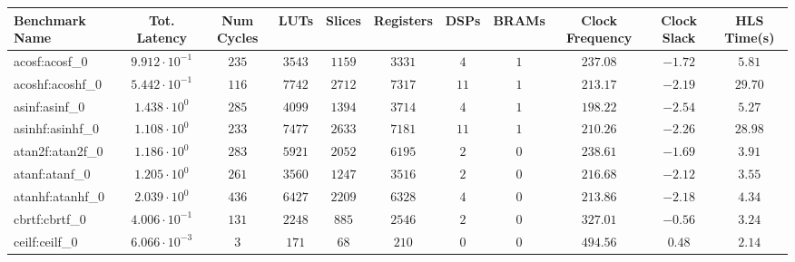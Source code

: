 \begin{tabular}{|l|c|c|c|c|c|c|c|c|c|c|}
\hline
Benchmark Name               & Tot. Latency            & Num Cycles & LUTs       & Slices    & Registers  & DSPs    & BRAMs & Clock Frequency & Clock Slack & HLS Time(s) \\
\hline
acosf:acosf\_0               & $ 9.912 \cdot 10^{-1} $ & $ 235    $ & $ 3543   $ & $ 1159  $ & $ 3331   $ & $ 4   $ & $ 1 $ & $ 237.08      $ & $ -1.72   $ & $ 5.81    $ \\
acoshf:acoshf\_0             & $ 5.442 \cdot 10^{-1} $ & $ 116    $ & $ 7742   $ & $ 2712  $ & $ 7317   $ & $ 11  $ & $ 1 $ & $ 213.17      $ & $ -2.19   $ & $ 29.70   $ \\
asinf:asinf\_0               & $ 1.438 \cdot 10^{0}  $ & $ 285    $ & $ 4099   $ & $ 1394  $ & $ 3714   $ & $ 4   $ & $ 1 $ & $ 198.22      $ & $ -2.54   $ & $ 5.27    $ \\
asinhf:asinhf\_0             & $ 1.108 \cdot 10^{0}  $ & $ 233    $ & $ 7477   $ & $ 2633  $ & $ 7181   $ & $ 11  $ & $ 1 $ & $ 210.26      $ & $ -2.26   $ & $ 28.98   $ \\
atan2f:atan2f\_0             & $ 1.186 \cdot 10^{0}  $ & $ 283    $ & $ 5921   $ & $ 2052  $ & $ 6195   $ & $ 2   $ & $ 0 $ & $ 238.61      $ & $ -1.69   $ & $ 3.91    $ \\
atanf:atanf\_0               & $ 1.205 \cdot 10^{0}  $ & $ 261    $ & $ 3560   $ & $ 1247  $ & $ 3516   $ & $ 2   $ & $ 0 $ & $ 216.68      $ & $ -2.12   $ & $ 3.55    $ \\
atanhf:atanhf\_0             & $ 2.039 \cdot 10^{0}  $ & $ 436    $ & $ 6427   $ & $ 2209  $ & $ 6328   $ & $ 4   $ & $ 0 $ & $ 213.86      $ & $ -2.18   $ & $ 4.34    $ \\
cbrtf:cbrtf\_0               & $ 4.006 \cdot 10^{-1} $ & $ 131    $ & $ 2248   $ & $ 885   $ & $ 2546   $ & $ 2   $ & $ 0 $ & $ 327.01      $ & $ -0.56   $ & $ 3.24    $ \\
ceilf:ceilf\_0               & $ 6.066 \cdot 10^{-3} $ & $ 3      $ & $ 171    $ & $ 68    $ & $ 210    $ & $ 0   $ & $ 0 $ & $ 494.56      $ & $ 0.48    $ & $ 2.14    $ \\

\end{tabular}
